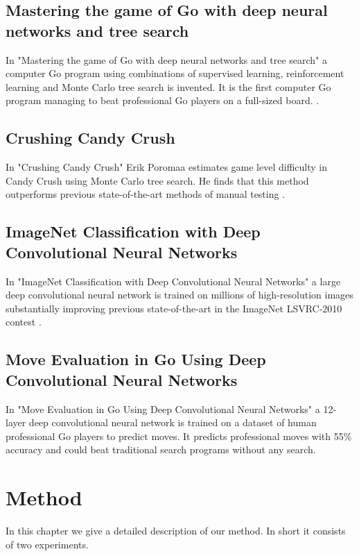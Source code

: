 \documentclass{kththesis}
\begin{document}
\section{Mastering the game of Go with deep neural networks and tree search}
In "Mastering the game of Go with deep neural networks and tree search" a computer Go program using combinations of supervised learning, reinforcement learning and Monte Carlo tree search is invented. It is the first computer Go program managing to beat professional Go players on a full-sized board. \cite{alphaGo2016}.  

\section{Crushing Candy Crush}
In "Crushing Candy Crush" Erik Poromaa estimates game level difficulty in Candy Crush using Monte Carlo tree search. He finds that this method outperforms previous state-of-the-art methods of manual testing \cite{poromaa2016}.

\section{ImageNet Classification with Deep Convolutional Neural Networks}
In "ImageNet Classification with Deep Convolutional Neural Networks" a large deep convolutional neural network is trained  on millions of high-resolution images  substantially improving previous state-of-the-art in the ImageNet LSVRC-2010 contest \cite{krizhevsky2012imagenet}.

\section{Move Evaluation in Go Using Deep Convolutional Neural Networks}
In "Move Evaluation in Go Using Deep Convolutional Neural Networks" a 12-layer deep convolutional neural network  is trained on a dataset of human professional Go players  to predict moves. It predicts professional moves with 55\% accuracy  and could beat traditional search programs without any search.

\chapter{Method}
In this chapter we give a detailed description of our method. In short it consists of two experiments. 
\end{document}
